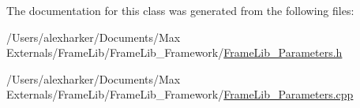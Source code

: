 The documentation for this class was generated from the following files\+:\begin{DoxyCompactItemize}
\item 
/\+Users/alexharker/\+Documents/\+Max Externals/\+Frame\+Lib/\+Frame\+Lib\+\_\+\+Framework/\hyperlink{_frame_lib___parameters_8h}{Frame\+Lib\+\_\+\+Parameters.\+h}\item 
/\+Users/alexharker/\+Documents/\+Max Externals/\+Frame\+Lib/\+Frame\+Lib\+\_\+\+Framework/\hyperlink{_frame_lib___parameters_8cpp}{Frame\+Lib\+\_\+\+Parameters.\+cpp}\end{DoxyCompactItemize}
